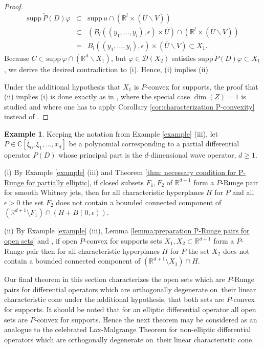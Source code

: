 \documentclass[a4paper,10pt]{amsart}
\newtheorem*{crucial lemma}{Lemma \ref{lem:nice polynomial2}}
\theoremstyle{definition}
\newtheorem{example}[theorem]{Example}
\newcommand{\R}{\mathbb{R}}
\newcommand{\C}{\mathbb{C}}
\newcommand{\supp}{\mbox{supp}\,}
\newcommand{\veryniceon}[1]{orthogonally degenerate on~#1}
\begin{document}
\begin{proof}
	\begin{eqnarray*}
	    \supp\check{P}(D)\varphi&\subset&\supp u\cap\left(\R^l\times (\overline{U}\backslash V)\right)\\
        &\subset& \left(B_l((y_1,\ldots,y_l),\epsilon)\times\overline{U}\right)\cap\left(\R^l\times (\overline{U}\backslash V)\right)\\
        &=&B_l((y_1,\ldots,y_l),\epsilon)\times (\overline{U}\backslash V)\subset X_1.
	\end{eqnarray*}
	Because $C\subset\supp\varphi\cap (\R^d\backslash X_1)$, but $\varphi\in\mathscr{D}(X_2)$ satisfies $\supp\check{P}(D)\varphi\subset X_1$, we derive the desired contradiction to (i). Hence, (i) implies (ii)
	
	Under the additional hypothesis that $X_1$ is $P$-convex for supports, the proof that (ii) implies (i) is done exactly as in \cite[Proof of Theorem 1, (iii) implies (i) and (ii)]{Kalmes2021}, where the special case $\operatorname{dim}(Z)=1$ is studied and where one has to apply Corollary \ref{cor:characterization P-convexity} instead of \cite[Theorem 7]{Kalmes2021}.
\end{proof}

\begin{example}\label{example:wave operator 2}
Keeping the notation from Example \ref{example} (iii), let $P\in\C[\xi_0,\xi_1,\ldots,x_d]$ be a polynomial corresponding to a partial differential operator $P(D)$ whose principal part is the $d$-dimensional wave operator, $d\geq1$. 

(i) By Example \ref{example} (iii) and Theorem \ref{thm: necessary condition for P-Runge for partially elliptic}, if closed subsets $F_1,F_2$ of $\R^{d+1}$ form a $P$-Runge pair for smooth Whitney jets, then for all characteristic hyperplanes $H$ for $P$ and all $\epsilon>0$ the set $F_2$ does not contain a bounded connected component of $(\R^{d+1}\setminus F_1)\cap (H+B(0,\epsilon))$.


(ii) By Example \ref{example} (iii), Lemma \ref{lemma:preparation P-Runge pairs for open sets} and \cite[Theorem 6]{Kalmes2021}, if open $P$-convex for supports sets $X_1,X_2\subset\R^{d+1}$ form a $P$-Runge pair then for all characteristic hyperplanes $H$ for $P$ the set $X_2$ does not contain a bounded connected component of $(\R^{d+1}\setminus X_1)\cap H$.
\end{example}


Our final theorem in this section characterizes the open sets which are $P$-Runge pairs for differential operators which are \veryniceon{their linear characteristic cone} under the additional hypothesis, that both sets are $P$-convex for supports. It should be noted that for an elliptic differential operator all open sets are  $P$-convex for supports. Hence the next theorem may be considered as an analogue to the celebrated Lax-Malgrange Theorem for non-elliptic differential operators which are \veryniceon{their linear characteristic cone}.
\end{document}
